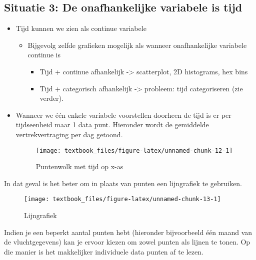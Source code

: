 \documentclass[]{tufte-book}
\providecommand{\tightlist}{%
  \setlength{\itemsep}{0pt}\setlength{\parskip}{0pt}}
\begin{document}
\hypertarget{situatie-3-de-onafhankelijke-variabele-is-tijd}{%
\subsection{Situatie 3: De onafhankelijke variabele is tijd}\label{situatie-3-de-onafhankelijke-variabele-is-tijd}}

\begin{itemize}
\tightlist
\item
  Tijd kunnen we zien als continue variabele

  \begin{itemize}
  \tightlist
  \item
    Bijgevolg zelfde grafieken mogelijk als wanneer onafhankelijke variabele continue is

    \begin{itemize}
    \tightlist
    \item
      Tijd + continue afhankelijk -\textgreater{} scatterplot, 2D histograms, hex bins
    \item
      Tijd + categorisch afhankelijk -\textgreater{} probleem: tijd categoriseren (zie verder).
    \end{itemize}
  \end{itemize}
\item
  Wanneer we één enkele variabele voorstellen doorheen de tijd is er per tijdseenheid maar 1 data punt. Hieronder wordt de gemiddelde vertrekvertraging per dag getoond.\\

  \begin{figure}
  \texttt{[image: textbook\_files/figure-latex/unnamed-chunk-12-1]} \caption[Puntenwolk met tijd op x-as]{Puntenwolk met tijd op x-as}\label{fig:unnamed-chunk-12}
  \end{figure}
\end{itemize}

In dat geval is het beter om in plaats van punten een lijngrafiek te gebruiken.

\begin{figure}
\texttt{[image: textbook\_files/figure-latex/unnamed-chunk-13-1]} \caption[Lijngrafiek]{Lijngrafiek}\label{fig:unnamed-chunk-13}
\end{figure}

Indien je een beperkt aantal punten hebt (hieronder bijvoorbeeld één maand van de vluchtgegevens) kan je ervoor kiezen om zowel punten als lijnen te tonen. Op die manier is het makkelijker individuele data punten af te lezen.
\end{document}

